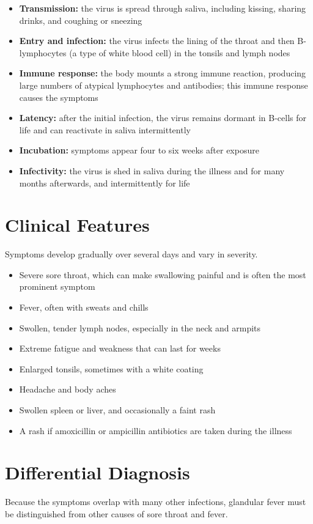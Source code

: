 \begin{itemize}
    \item \textbf{Transmission:} the virus is spread through saliva, including kissing, sharing drinks, and coughing or sneezing
    \item \textbf{Entry and infection:} the virus infects the lining of the throat and then B-lymphocytes (a type of white blood cell) in the tonsils and lymph nodes
    \item \textbf{Immune response:} the body mounts a strong immune reaction, producing large numbers of atypical lymphocytes and antibodies; this immune response causes the symptoms
    \item \textbf{Latency:} after the initial infection, the virus remains dormant in B-cells for life and can reactivate in saliva intermittently
    \item \textbf{Incubation:} symptoms appear four to six weeks after exposure
    \item \textbf{Infectivity:} the virus is shed in saliva during the illness and for many months afterwards, and intermittently for life
\end{itemize}

\section*{Clinical Features}
Symptoms develop gradually over several days and vary in severity.

\begin{itemize}
    \item Severe sore throat, which can make swallowing painful and is often the most prominent symptom
    \item Fever, often with sweats and chills
    \item Swollen, tender lymph nodes, especially in the neck and armpits
    \item Extreme fatigue and weakness that can last for weeks
    \item Enlarged tonsils, sometimes with a white coating
    \item Headache and body aches
    \item Swollen spleen or liver, and occasionally a faint rash
    \item A rash if amoxicillin or ampicillin antibiotics are taken during the illness
\end{itemize}

\section*{Differential Diagnosis}
Because the symptoms overlap with many other infections, glandular fever must be distinguished from other causes of sore throat and fever.

